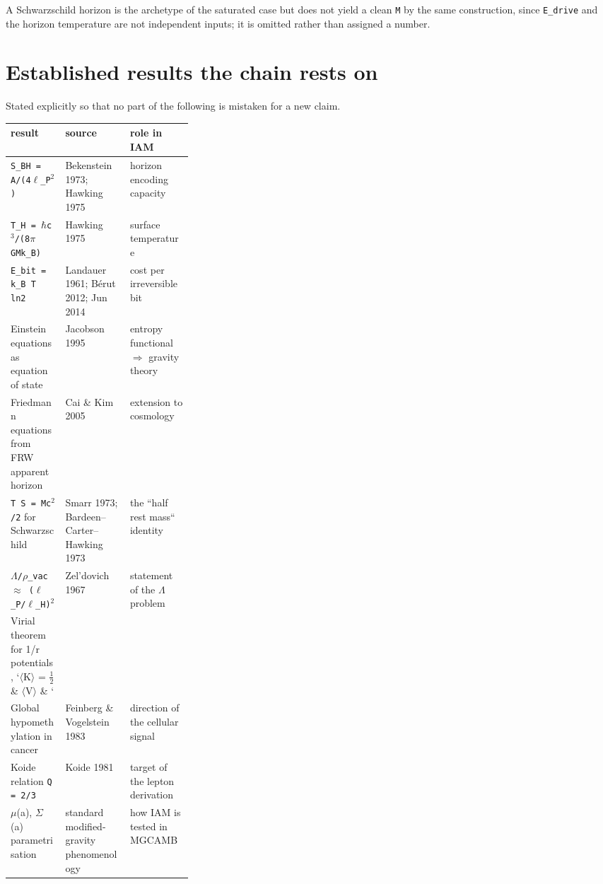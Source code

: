 \documentclass[12pt,a4paper]{article}
\begin{document}
A Schwarzschild horizon is the archetype of the saturated case but does not yield a clean \texttt{M} by the same construction, since \texttt{E\_drive} and the horizon temperature are not independent inputs; it is omitted rather than assigned a number.





\section{Established results the chain rests on}

Stated explicitly so that no part of the following is mistaken for a new claim.


\begin{small}
\begin{tabularx}{\linewidth}{L{0.30\linewidth}YY}
\toprule
\textbf{result} & \textbf{source} & \textbf{role in IAM} \\
\midrule
\texttt{S\_\allowbreak{}BH = A/\allowbreak{}(4$\ell$\_\allowbreak{}P$^{2}$)} & Bekenstein 1973; Hawking 1975 & horizon encoding capacity \\
\texttt{T\_\allowbreak{}H = $\hbar$c$^{3}$/\allowbreak{}(8$\pi$GMk\_\allowbreak{}B)} & Hawking 1975 & surface temperature \\
\texttt{E\_\allowbreak{}bit = k\_\allowbreak{}B T ln2} & Landauer 1961; Bérut 2012; Jun 2014 & cost per irreversible bit \\
Einstein equations as equation of state & Jacobson 1995 & entropy functional $\Longrightarrow$ gravity theory \\
Friedmann equations from FRW apparent horizon & Cai \& Kim 2005 & extension to cosmology \\
\texttt{T S = Mc$^{2}$/\allowbreak{}2} for Schwarzschild & Smarr 1973; Bardeen--Carter--Hawking 1973 & the ``half rest mass`` identity \\
\texttt{$\Lambda$/\allowbreak{}$\rho$\_\allowbreak{}vac $\approx$ ($\ell$\_\allowbreak{}P/\allowbreak{}$\ell$\_\allowbreak{}H)$^{2}$} & Zel'dovich 1967 & statement of the $\Lambda$ problem \\
Virial theorem for 1/r potentials, `$\langle$K$\rangle$ = $\tfrac{1}{2}$ \& $\langle$V$\rangle$ \& ` \\
Global hypomethylation in cancer & Feinberg \& Vogelstein 1983 & direction of the cellular signal \\
Koide relation \texttt{Q = 2/\allowbreak{}3} & Koide 1981 & target of the lepton derivation \\
$\mu$(a), $\Sigma$(a) parametrisation & standard modified-gravity phenomenology & how IAM is tested in MGCAMB \\
\bottomrule
\end{tabularx}
\end{small}
\end{document}

